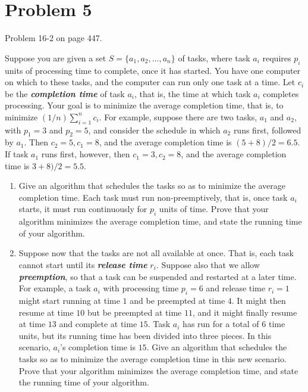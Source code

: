 \documentclass{../../class}
\begin{document}
\section*{Problem 5}
\begin{tcolorbox}
    Problem 16-2 on page 447.
\end{tcolorbox}
Suppose you are given a set $S = \{a_1, a_2, \dots, a_n\}$ of tasks, where task $a_i$ requires $p_i$ units of processing time to complete, once it has started. You have one computer on which to these tasks, and the computer can run only one task at a time. Let $c_i$ be the \textbf{\textit{completion time}} of task $a_i$, that is, the time at which task $a_i$ completes processing. Your goal is to minimize the average completion time, that is, to minimize $(1 / n) \sum_{i=1}^{n} c_i$. For example, suppose there are two tasks, $a_1$ and $a_2$, with $p_1 = 3$ and $p_2 = 5$, and consider the schedule in which $a_2$ runs first, followed by $a_1$. Then $c_2 = 5, c_1 = 8$, and the average completion time is $(5 + 8) / 2 = 6.5$. If task $a_1$ runs first, however, then $c_1 = 3, c_2 = 8$, and the average completion time is $3 + 8) / 2 = 5.5$.
\begin{enumerate}[label=\textbf{\textit{\alph*}}]
    \item Give an algorithm that schedules the tasks so as to minimize the average completion time. Each task must run non-preemptively, that is, once task $a_i$ starts, it must run continuously for $p_i$ units of time. Prove that your algorithm minimizes the average completion time, and state the running time of your algorithm.
    \item Suppose now that the tasks are not all available at once. That is, each task cannot start until its \textbf{\textit{release time}} $r_i$. Suppose also that we allow \textbf{\textit{preemption}}, so that a task can be suspended and restarted at a later time. For example, a task $a_i$ with processing time $p_i = 6$ and release time $r_i = 1$ might start running at time $1$ and be preempted at time $4$. It might then resume at time $10$ but be preempted at time $11$, and it might finally resume at time $13$ and complete at time $15$. Task $a_i$ has run for a total of $6$ time units, but its running time has been divided into three pieces. In this scenario, $a_i$’s completion time is $15$. Give an algorithm that schedules the tasks so as to minimize the average completion time in this new scenario. Prove that your algorithm minimizes the average completion time, and state the running time of your algorithm.
\end{enumerate}
\end{document}
